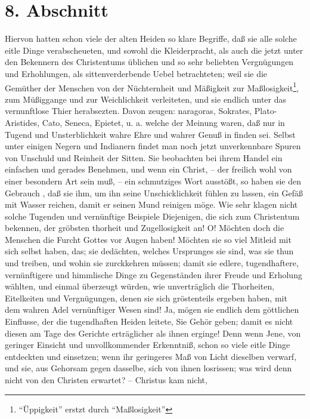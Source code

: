 \section{8. Abschnitt} \label{kap14_ab8}
Hiervon hatten schon viele der alten Heiden so klare Begriffe, daß sie alle
solche eitle Dinge verabscheueten, und sowohl die Kleiderpracht, als auch die
jetzt unter den Bekennern des Christentums üblichen und so sehr beliebten
Vergnügungen und Erhohlungen, als sittenverderbende Uebel betrachteten; weil sie
die Gemüther der Menschen von der Nüchternheit und Mäßigkeit zur Maßlosigkeit\footnote{"`Üppigkeit"' erstzt durch "`Maßlosigkeit"'}, zum
Müßiggange und zur Weichlichkeit verleiteten, und sie endlich unter das
vernunftlose Thier herabsezten. Davon zeugen: naragoras, Sokrates, Plato-
Aristides, Cato, Seneca, Epietet, u. a. welche der Meinung waren, daß nur in
Tugend und Unsterblichkeit wahre Ehre und wahrer Genuß in finden sei. Selbst
unter einigen Negern und Indianern findet man noch jetzt unverkennbare Spuren
von Unschuld und Reinheit der Sitten. Sie beobachten bei ihrem Handel ein
einfachen und gerades Benehmen, und wenn ein Christ, -- der freilich wohl von
einer besondern Art sein muß, -- ein schmutziges Wort ausstößt, so haben sie den
Gebrauch , daß sie ihm, um ihn seine Unschicklichkeit fühlen zu lassen, ein
Gefäß mit Wasser reichen, damit er seinen Mund reinigen möge. Wie sehr klagen
nicht solche Tugenden und vernünftige Beispiele Diejenigen, die sich zum
Christentum bekennen, der gröbsten thorheit und Zugellosigkeit an! O! Möchten
doch die Menschen die Furcht Gottes vor Augen haben! Möchten sie so viel Mitleid
mit sich selbst haben, das; sie dedächten, welches Ursprunges sie sind, was sie
thun und treiben, und wohin sie zurckkehren müssen; damit sie edlere,
tugendhaftere, vernünftigere und himmlische Dinge zu Gegenständen ihrer Freude
und Erholung wählten, und einmal überzeugt würden, wie unverträglich die
Thorheiten, Eitelkeiten und Vergnügungen, denen sie sich gröstenteils ergeben
haben, mit dem wahren Adel vernünftiger Wesen sind! Ja, mögen sie endlich dem
göttlichen Einflusse, der die tugendhaften Heiden leitete, Sie Gehör geben;
damit es nicht diesen am Tage des Gerichte erträglicher als ihnen erginge! Denn
wenn Jene, von geringer Einsicht und unvollkommender Erkenntniß, schon so viele
eitle Dinge entdeckten und einsetzen; wenn ihr geringeres Maß von Licht
dieselben verwarf, und sie, aus Gehorsam gegen dasselbe, sich von ihnen
losrissen; was wird denn nicht von den Christen erwartet? -- Christus kam nicht,
